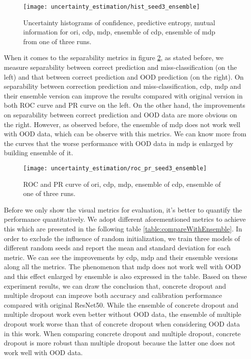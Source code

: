 \begin{figure}[H]
	\begin{center}
		\texttt{[image: uncertainty\_estimation/hist\_seed3\_ensemble]}
		\caption{Uncertainty histograms of confidence, predictive entropy, mutual information for ori, cdp, mdp, ensemble of cdp, ensemble of mdp from one of three runs.}		
		\label{exp2_histo}
	\end{center}
\end{figure}

When it comes to the separability metrics in figure \ref{exp2_roc_pr}, as stated before, we measure separability between correct prediction and miss-classification (on the left) and that between correct prediction and OOD prediction (on the right). On separability between correction prediction and miss-classification, cdp, mdp and their ensemble version can improve the results compared with original version in both ROC curve and PR curve on the left. On the other hand, the improvements on separability between correct prediction and OOD data are more obvious on the right. However, as observed before, the ensemble of mdp does not work well with OOD data, which can be observe with this metrics. We can know more from the curves that the worse performance with OOD data in mdp is enlarged by building ensemble of it.    

\begin{figure}[H]
	\begin{center}
		\texttt{[image: uncertainty\_estimation/roc\_pr\_seed3\_ensemble]}
		\caption{ROC and PR curve of ori, cdp, mdp, ensemble of cdp, ensemble of one of three runs.}		
		\label{exp2_roc_pr}
	\end{center} 
\end{figure}

Before we only show the visual metrics for evaluation, it's better to quantify the performance quantitatively. We adopt different aforementioned metrics to achieve this which are presented in the following table \ref{table:compareWithEnsemble}. In order to exclude the influence of random initialization, we train three models of different random seeds and report the mean and standard deviation for each metric. We can see the improvements by cdp, mdp and their ensemble versions along all the metrics. The phenomenon that mdp does not work well with OOD and this effect enlarged by ensemble is also expressed in the table. Based on these experiment results, we can draw the conclusion that, concrete dropout and multiple dropout can improve both accuracy and calibration performance compared with original ResNet50. While the ensemble of concrete dropout and multiple dropout work even better without OOD data, the ensemble of multiple dropout work worse than that of concrete dropout when considering OOD data in this work. When comparing concrete dropout and multiple dropout, concrete dropout is more robust than multiple dropout because the latter one does not work well with OOD data.

